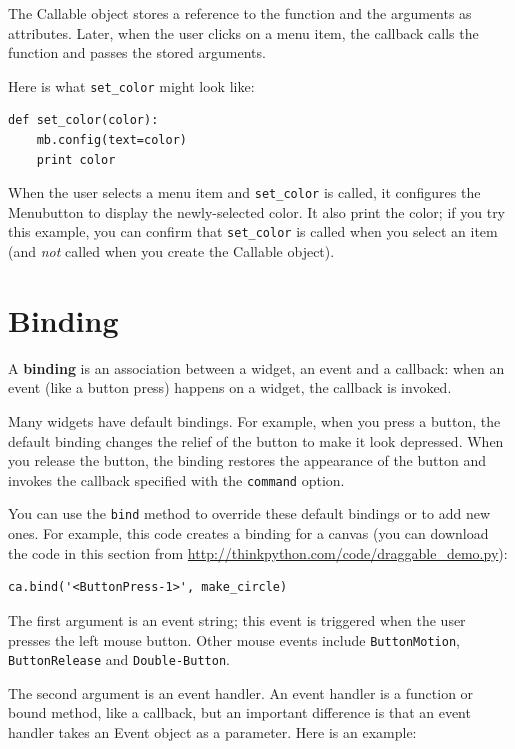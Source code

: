 \documentclass[10pt]{book}
\begin{document}
\begin{CJK}{UTF8}{gbsn}
The Callable object stores a reference to the function and the
arguments as attributes.  Later, when the user clicks on a menu
item, the callback calls the function and passes the stored
arguments.

Here is what \verb"set_color" might look like:

\begin{verbatim}
def set_color(color):
    mb.config(text=color)
    print color
\end{verbatim}
%
When the user selects a menu item and \verb"set_color" is called,
it configures the Menubutton to display the newly-selected color.
It also print the color; if you try this example, you can confirm that
\verb"set_color" is called when you select an item (and {\em not}
called when you create the Callable object).


\section{Binding}

A {\bf binding} is an association between a widget, an event and a
callback: when an event (like a button press) happens on a widget, the
callback is invoked.

Many widgets have default bindings.  For example, when you press
a button, the default binding changes the relief of the button
to make it look depressed.  When you release the button, the
binding restores the appearance of the button and invokes the
callback specified with the {\tt command} option.

You can use the {\tt bind} method to override these default
bindings or to add new ones.  For example, this code creates a
binding for a canvas (you can download the code in this
section from \url{http://thinkpython.com/code/draggable_demo.py}):

\begin{verbatim}
ca.bind('<ButtonPress-1>', make_circle)
\end{verbatim}
%
The first argument is an event string; this event is triggered
when the user presses the left mouse button.  Other mouse
events include {\tt ButtonMotion}, {\tt ButtonRelease} and
{\tt Double-Button}.

The second argument is an event handler.  An event handler
is a function or bound method, like a callback, but an important
difference is that an event handler takes an Event object as a
parameter.  Here is an example:


\end{CJK}
\end{document}
